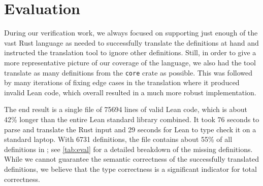 \section{Evaluation}
\label{sec:eval}

During our verification work, we always focused on supporting just enough of the vast Rust
language as needed to successfully translate the definitions at hand and
instructed the translation tool to ignore other definitions. Still, in order to give a more representative picture of
our coverage of the language, we also had the tool translate as many definitions
from the \verb!core! crate as possible. This was followed by many iterations of
fixing edge cases in the translation where it produced invalid Lean code, which
overall resulted in a much more robust implementation.

The end result is a single file of 75694 lines of valid Lean code, which
is about 42\% longer than the entire Lean standard library combined.
It took 76 seconds to parse and translate the Rust input and 29 seconds for
Lean to type check it on a standard laptop. With 6731
definitions, the file contains about 55\% of all definitions in ; see
\autoref{tab:eval} for a detailed breakdown of the missing definitions. While we
cannot guarantee the semantic correctness of the successfully translated
definitions, we believe that the type correctness is a significant indicator
for total correctness.

